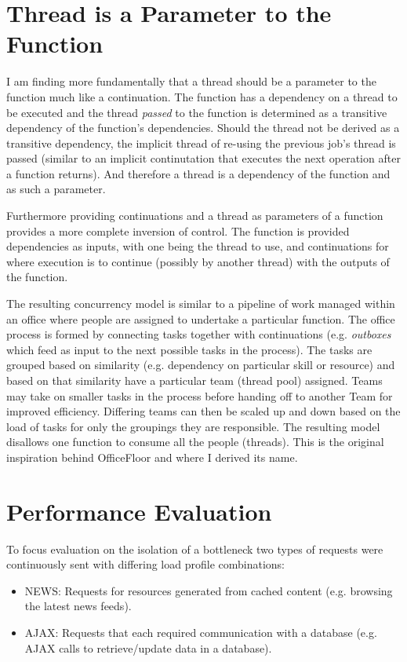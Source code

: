 \documentclass[conference]{ieee/IEEEtran}
\begin{document}
\section{Thread is a Parameter to the Function}
I am finding more fundamentally that a thread should be a parameter to the
function much like a continuation.  The function has a dependency on a thread
to be executed and the thread \textit{passed} to the function is determined as
a transitive dependency of the function's dependencies.  Should the thread not
be derived as a transitive dependency, the implicit thread of re-using the
previous job's thread is passed (similar to an implicit continutation that
executes the next operation after a function returns).  And therefore a thread
is a dependency of the function and as such a parameter.

Furthermore providing continuations and a thread as parameters of a function
provides a more complete inversion of control.  The function is provided
dependencies as inputs, with one being the thread to use, and continuations for
where execution is to continue (possibly by another thread) with the outputs of
the function.

The resulting concurrency model is similar to a pipeline of work managed within
an office where people are assigned to undertake a particular function.
The office process is formed by connecting tasks together with continuations
(e.g. \textit{outboxes} which feed as input to the next possible tasks in the
process).  The tasks are grouped based on similarity (e.g. dependency on
particular skill or resource) and based on that similarity have a particular
team (thread pool) assigned.  Teams may take on smaller tasks in the process
before handing off to another Team for improved efficiency.  Differing teams can
then be scaled up and down based on the load of tasks for only the groupings
they are responsible.  The resulting model disallows one function to consume all
the people (threads).  This is the original inspiration behind OfficeFloor and
where I derived its name.



\section{Performance Evaluation}
To focus evaluation on the isolation of a bottleneck two types of requests were
continuously sent with differing load profile combinations:
\begin{itemize}
\item NEWS: Requests for resources generated from cached content (e.g. browsing
the latest news feeds).
\item AJAX: Requests that each required communication with a database (e.g.
AJAX calls to retrieve/update data in a database).
\end{itemize}
\end{document}
